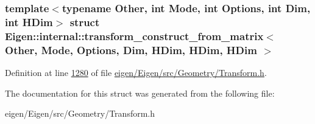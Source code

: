 \subsubsection*{template$<$typename Other, int Mode, int Options, int Dim, int H\+Dim$>$\newline
struct Eigen\+::internal\+::transform\+\_\+construct\+\_\+from\+\_\+matrix$<$ Other, Mode, Options, Dim, H\+Dim, H\+Dim, H\+Dim $>$}



Definition at line \hyperlink{eigen_2_eigen_2src_2_geometry_2_transform_8h_source_l01280}{1280} of file \hyperlink{eigen_2_eigen_2src_2_geometry_2_transform_8h_source}{eigen/\+Eigen/src/\+Geometry/\+Transform.\+h}.



The documentation for this struct was generated from the following file\+:\begin{DoxyCompactItemize}
\item 
eigen/\+Eigen/src/\+Geometry/\+Transform.\+h\end{DoxyCompactItemize}
